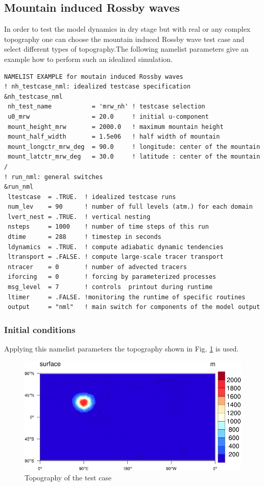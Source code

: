 \subsection{Mountain induced Rossby waves}

In order to test the model dynamics in dry stage but with real or any complex topography one can choose the mountain induced Rossby wave test case and select different types of topography.The following namelist parameters give an example how to perform such an idealized simulation.


\begin{Verbatim}[frame=single]
NAMELIST EXAMPLE for moutain induced Rossby waves
! nh_testcase_nml: idealized testcase specification 
&nh_testcase_nml
 nh_test_name           = 'mrw_nh' ! testcase selection
 u0_mrw                 = 20.0     ! initial u-component 
 mount_height_mrw       = 2000.0   ! maximum mountain height 
 mount_half_width       = 1.5e06   ! half width of mountain
 mount_longctr_mrw_deg  = 90.0     ! longitude: center of the mountain
 mount_latctr_mrw_deg   = 30.0     ! latitude : center of the mountain
/
! run_nml: general switches 
&run_nml
 ltestcase  = .TRUE.  ! idealized testcase runs
 num_lev    = 90      ! number of full levels (atm.) for each domain
 lvert_nest = .TRUE.  ! vertical nesting
 nsteps     = 1000    ! number of time steps of this run
 dtime      = 288     ! timestep in seconds
 ldynamics  = .TRUE.  ! compute adiabatic dynamic tendencies
 ltransport = .FALSE. ! compute large-scale tracer transport
 ntracer    = 0       ! number of advected tracers
 iforcing   = 0       ! forcing by parameterized processes
 msg_level  = 7       ! controls  printout during runtime
 ltimer     = .FALSE. !monitoring the runtime of specific routines
 output     = "nml"   ! main switch for components of the model output

\end{Verbatim}


\subsubsection{Initial conditions}

Applying this namelist parameters the topography shown in Fig. \ref{fig:mountain} is used.

\begin{figure}[h!]%
\centering
\includegraphics[width=0.95\linewidth]{pictures/surface-small.png}
\caption{Topography of the test case}\label{fig:mountain}
\end{figure}

